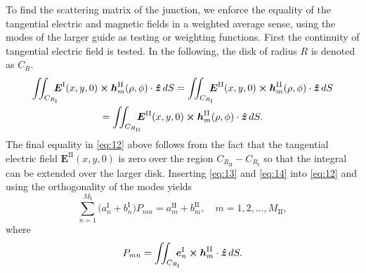 \documentclass[11pt]{article}
\newcommand{\z}{\boldsymbol{\hat{z}}}
\newcommand{\cross}{\boldsymbol{\times}}
\newcommand{\E}{\boldsymbol{E}}
\newcommand{\EI}{\E^{\text{I}}}
\newcommand{\EII}{\E^{\text{II}}}
\newcommand{\e}{\boldsymbol{e}}
\newcommand{\h}{\boldsymbol{h}}
\newcommand{\I}{\ensuremath{\text{I}}}
\newcommand{\II}{\ensuremath{\text{II}}}
\newcommand{\eI}{\e^{\text{I}}}
\newcommand{\hII}{\h^{\text{II}}}
\newcommand{\MI}{M_{\text{I}}}
\newcommand{\MII}{M_{\text{II}}}
\newcommand{\aI}{a^{\text{I}}}
\newcommand{\aII}{a^{\text{II}}}
\newcommand{\bI}{b^{\text{I}}}
\newcommand{\bII}{b^{\text{II}}}
\begin{document}
To find the scattering matrix of the junction, we enforce the equality
of the tangential electric and magnetic fields in a weighted average sense,
using the modes of the larger guide as testing or weighting functions.  First the
continuity of tangential electric field is tested. In the
following, the disk of radius $R$ is denoted as $C_{R}$.
\begin{multline}
  \label{eq:12}
  \iint_{C_{R_\I}}\mkern-12mu \EI(x,y,0) \cross   \hII_m(\rho,\phi) \cdot \z \, dS
  = 
  \iint_{C_{R_\I}}\mkern-12mu \EII(x,y,0) \cross  \hII_m(\rho,\phi) \cdot \z \, dS
  \\ = 
  \iint_{C_{R_\II}}\mkern-12mu \EII(x,y,0) \cross \hII_m(\rho,\phi) \cdot \z \, dS.
\end{multline}
The final equality in \eqref{eq:12} above follows from the fact that
the tangential electric field $\EII(x,y,0)$ is zero over the region
$C_{R_\II} - C_{R_\I}$ so that the integral can be extended over the larger
disk. Inserting \eqref{eq:13} and \eqref{eq:14} into \eqref{eq:12}
and using the orthogonality of the modes yields
\begin{equation}
  \label{eq:15}
  \sum_{n=1}^{\MI} \bigl(\aI_n + \bI_n\bigr) P_{mn} = \aII_m + \bII_m,
  \quad m = 1, 2, \ldots, \MII,
\end{equation}
where
\begin{equation}
  \label{eq:16}
  P_{mn} =    
  \iint_{C_{R_{\I}}} \mkern-12mu \eI_n \cross \hII_m \cdot \z \, dS.
\end{equation}
\end{document}
